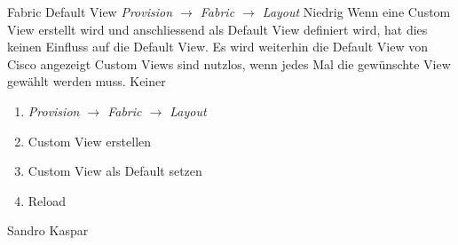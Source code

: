 \bugreport
{Fabric Default View}
{\textit{ Provision $\rightarrow$ Fabric $\rightarrow$ Layout}}
{Niedrig}
{Wenn eine Custom View erstellt wird und anschliessend als Default View definiert wird, hat dies keinen Einfluss auf die Default View. Es wird weiterhin die Default View von Cisco angezeigt
}
{Custom Views sind nutzlos, wenn jedes Mal die gewünschte View gewählt werden muss.}
{Keiner}
{
	\begin{enumerate}
		\item \textit{Provision $\rightarrow$ Fabric $\rightarrow$ Layout}
		\item Custom View erstellen
		\item Custom View als Default setzen
		\item Reload
	\end{enumerate}
}
{Sandro Kaspar}
{}